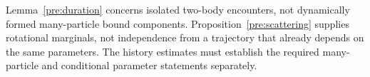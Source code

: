 \begin{remark}\label{pre:no-manybody-conclusion}
Lemma~\ref{pre:duration} concerns isolated two-body encounters, not
dynamically formed many-particle bound components.
Proposition~\ref{pre:scattering} supplies rotational marginals, not
independence from a trajectory that already depends on the same
parameters. The history estimates must establish the required
many-particle and conditional parameter statements separately.
\end{remark}
